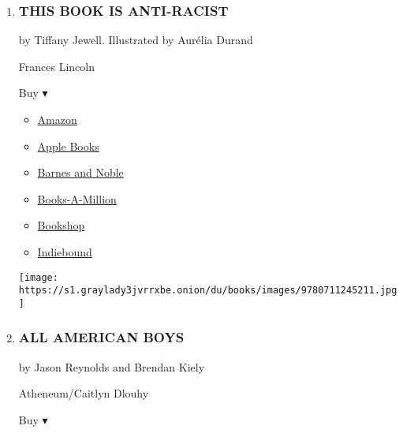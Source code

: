 \begin{enumerate}
\def\labelenumi{\arabic{enumi}.}
\item
  \hypertarget{this-book-is-anti-racist}{%
  \subsubsection{THIS BOOK IS
  ANTI-RACIST}\label{this-book-is-anti-racist}}

  by Tiffany Jewell. Illustrated by Aurélia Durand

  Frances Lincoln

  Buy ▾

  \begin{itemize}
  \tightlist
  \item
    \href{https://www.amazon.com/dp/0711245215?tag=NYTBSREV-20\&tag=NYTBS-20}{Amazon}
  \item
    \href{https://du-gae-books-dot-nyt-du-prd.appspot.com/buy?title=THIS+BOOK+IS+ANTI-RACIST\&author=Tiffany+Jewell}{Apple
    Books}
  \item
    \href{https://www.anrdoezrs.net/click-7990613-11819508?url=https\%3A\%2F\%2Fwww.barnesandnoble.com\%2Fw\%2F\%3Fean\%3D9780711245211}{Barnes
    and Noble}
  \item
    \href{https://www.anrdoezrs.net/click-7990613-35140?url=https\%3A\%2F\%2Fwww.booksamillion.com\%2Fp\%2FTHIS\%2BBOOK\%2BIS\%2BANTI-RACIST\%2FTiffany\%2BJewell\%2F9780711245211}{Books-A-Million}
  \item
    \href{https://bookshop.org/a/3546/9780711245211}{Bookshop}
  \item
    \href{https://www.indiebound.org/book/9780711245211?aff=NYT}{Indiebound}
  \end{itemize}

  \texttt{[image: https://s1.graylady3jvrrxbe.onion/du/books/images/9780711245211.jpg]}
\item
  \hypertarget{all-american-boys}{%
  \subsubsection{ALL AMERICAN BOYS}\label{all-american-boys}}

  by Jason Reynolds and Brendan Kiely

  Atheneum/Caitlyn Dlouhy

  Buy ▾


\end{enumerate}
